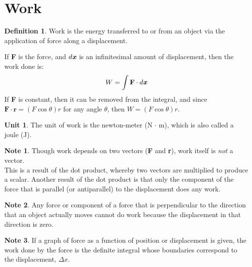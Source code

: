 \documentclass{article}
\theoremstyle{definition}
\newtheorem*{unit}{Unit}
\theoremstyle{definition}
\newtheorem*{note}{Note}
\theoremstyle{definition}
\theoremstyle{definition}
\newtheorem*{definition}{Definition}
\theoremstyle{definition}
\begin{document}
\section{Work}
\begin{definition}
    Work is the energy transferred to or from an object via the application of force along a displacement.
\end{definition}
If \textbf{F} is the force, and $d \textbf{\textit{x}}$ is an infinitesimal amount of displacement, then the work done is:
\begin{equation*}
    W = \int \textbf{F} \cdot d \textbf{\textit{x}}
\end{equation*}
If \textbf{F} is constant, then it can be removed from the integral, and since $\textbf{F} \cdot \textbf{r} = (F\cos\theta)r$ for any angle $\theta$, then $W = (F\cos\theta)r$.
\begin{unit}
    The unit of work is the newton-meter (N $\cdot$ m), which is also called a joule (J).
\end{unit}
\begin{note}
    Though work depends on two vectors (\textbf{F} and \textbf{r}), work itself is \textit{not} a vector. \\
This is a result of the dot product, whereby two vectors are multiplied to produce a scalar. Another result of the dot product is that only the component of the force that is parallel (or antiparallel) to the displacement does any work.
\end{note}
\begin{note}
    Any force or component of a force that is perpendicular to the direction that an object actually moves cannot do work because the displacement in that direction is zero.
\end{note}
\begin{note}
    If a graph of force as a function of position or displacement is given, the work done by the force is the definite integral whose boundaries correspond to the displacement, $\Delta x$.
\end{note}
\end{document}
